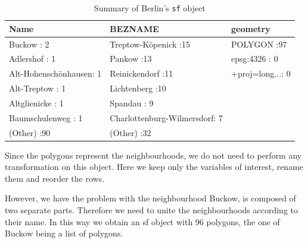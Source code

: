 \begin{table}[H]
\centering
\begin{tabular}{lll}
  \hline \hline
                  Name &                       BEZNAME &          geometry \\ 
  \hline
Buckow              : 2   & Treptow-Köpenick          :15   & POLYGON      :97   \\ 
  Adlershof           : 1   & Pankow                    :13   & epsg:4326    : 0   \\ 
  Alt-Hohenschönhausen: 1   & Reinickendorf             :11   & +proj=long...: 0   \\ 
  Alt-Treptow         : 1   & Lichtenberg               :10   &  \\ 
  Altglienicke        : 1   & Spandau                   : 9   &  \\ 
  Baumschulenweg      : 1   & Charlottenburg-Wilmersdorf: 7   &  \\ 
  (Other)             :90   & (Other)                   :32   &  \\ 
   \hline \hline
\end{tabular}
\caption{Summary of Berlin's \texttt{sf} object}
\end{table}

Since the polygons represent the neighbourhoods, we do not need to perform any transformation on this object. Here we keep only the variables of interest, rename them and reorder the rows.



However, we have the problem with the neighbourhood Buckow, is composed of two separate
parts. Therefore we need to unite the neighbourhoods according to their name. In this way we obtain an sf object with 96 polygons, the one of Buckow being a list of polygons.



